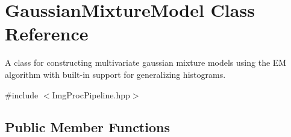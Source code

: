 \hypertarget{classGaussianMixtureModel}{\section{\-Gaussian\-Mixture\-Model \-Class \-Reference}
\label{classGaussianMixtureModel}
}


\-A class for constructing multivariate gaussian mixture models using the \-E\-M algorithm with built-\/in support for generalizing histograms.  




{\ttfamily \#include $<$\-Img\-Proc\-Pipeline.\-hpp$>$}

\subsection*{\-Public \-Member \-Functions}

